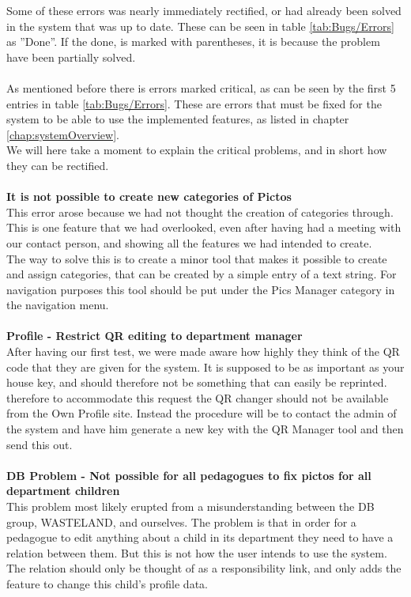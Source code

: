 Some of these errors was nearly immediately rectified, or had already been solved in the system that was up to date. These can be seen in table \ref{tab:Bugs/Errors} as ''Done''. If the done, is marked with parentheses, it is because the problem have been partially solved.\\
\\
As mentioned before there is errors marked critical, as can be seen by the first 5 entries in table \ref{tab:Bugs/Errors}. These are errors that must be fixed for the system to be able to use the implemented features, as listed in chapter \vref{chap:systemOverview}.\\
We will here take a moment to explain the critical problems, and in short how they can be rectified.\\
\\
\textbf{It is not possible to create new categories of Pictos}\\
This error arose because we had not thought the creation of categories through. This is one feature that we had overlooked, even after having had a meeting with our contact person, and showing all the features we had intended to create.\\
The way to solve this is to create a minor tool that makes it possible to create and assign categories, that can be created by a simple entry of a text string. For navigation purposes this tool should be put under the Pics Manager category in the navigation menu.\\
\\
\textbf{Profile - Restrict QR editing to department manager}\\
After having our first test, we were made aware how highly they think of the QR code that they are given for the system. It is supposed to be as important as your house key, and should therefore not be something that can easily be reprinted.\\
therefore to accommodate this request the QR changer should not be available from the Own Profile site. Instead the procedure will be to contact the admin of the system and have him generate a new key with the QR Manager tool and then send this out.\\
\\
\textbf{DB Problem - Not possible for all pedagogues to fix pictos for all department children}\\
This problem most likely erupted from a misunderstanding between the DB group, WASTELAND, and ourselves. The problem is that in order for a pedagogue to edit anything about a child in its department they need to have a relation between them. But this is not how the user intends to use the system. The relation should only be thought of as a responsibility link, and only adds the feature to change this child's profile data.\\
